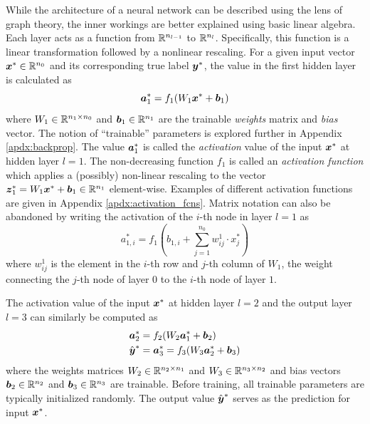 While the architecture of a neural network can be described using the lens of graph theory, the inner workings are better explained using basic linear algebra. Each layer acts as a function from $\mathbb{R}^{n_{l-1}}$ to $\mathbb{R}^{n_{l}}$. Specifically, this function is a linear transformation followed by a nonlinear rescaling. For a given input vector $\boldsymbol{x}^* \in \mathbb{R}^{n_0}$ and its corresponding true label $\boldsymbol{y}^*$, the value in the first hidden layer is calculated as
\begin{equation}
  \boldsymbol{a}_1^* = f_1(W_1 \boldsymbol{x}^* + \boldsymbol{b}_1)
  \label{eq:hid_layer}
\end{equation}
where $W_1 \in \mathbb{R}^{n_1 \times n_0}$ and $\boldsymbol{b}_1 \in\mathbb{R}^{n_1}$ are the trainable \textit{weights} matrix and \textit{bias} vector. The notion of ``trainable'' parameters is explored further in Appendix \ref{apdx:backprop}. The value $\boldsymbol{a}_1^*$ is called the \textit{activation} value of the input $\boldsymbol{x}^*$ at hidden layer $l=1$. The non-decreasing function $f_1$ is called an \textit{activation function} which applies a (possibly) non-linear rescaling to the vector $\boldsymbol{z}_1^* = W_1 \boldsymbol{x}^* + \boldsymbol{b}_1 \in \mathbb{R}^{n_1}$ element-wise. Examples of different activation functions are given in Appendix \ref{apdx:activation_fcns}. Matrix notation can also be abandoned by writing the activation of the $i$-th node in layer $l=1$ as 
\begin{equation}
  a_{1,i}^* = f_1\left(b_{1,i} + \sum_{j=1}^{n_0} w_{ij}^1 \cdot x_j^* \right)
  \label{eq:element_activation}
\end{equation}
where $w_{ij}^1$ is the element in the $i$-th row and $j$-th column of $W_1$, the weight connecting the $j$-th node of layer $0$ to the $i$-th node of layer $1$.

The activation value of the input $\boldsymbol{x}^*$ at hidden layer $l=2$ and the output layer $l=3$ can similarly be computed as
\begin{equation}
  \begin{split}
    \boldsymbol{a}_2^* &= f_2(W_2 \boldsymbol{a}_1^* + \boldsymbol{b}_2) \\
    \hat{\boldsymbol{y}}^* &= \boldsymbol{a}_3^* = f_3(W_3 \boldsymbol{a}_2^* + \boldsymbol{b}_3)
  \end{split}
  \label{eq:ffn_comp}
\end{equation}
where the weights matrices $W_2 \in \mathbb{R}^{n_2 \times n_1}$ and $W_3 \in \mathbb{R}^{n_3 \times n_2}$ and bias vectors $\boldsymbol{b}_2 \in \mathbb{R}^{n_2}$ and $\boldsymbol{b}_3 \in \mathbb{R}^{n_3}$ are trainable. Before training, all trainable parameters are typically initialized randomly. The output value $\hat{\boldsymbol{y}}^*$ serves as the prediction for input $\boldsymbol{x}^*$. 

